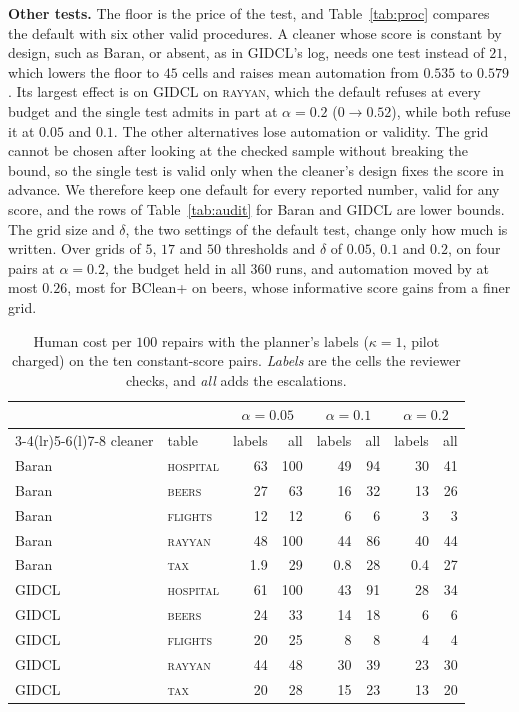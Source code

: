 \documentclass[sigconf, nonacm, balance=false]{acmart}
\theoremstyle{remark}
\begin{document}
\textbf{Other tests.} The floor is the price of the test, and Table~\ref{tab:proc}
compares the default with six other valid procedures. A cleaner whose score is
constant by design, such as Baran, or absent, as in GIDCL's log, needs one test instead of $21$, which lowers the
floor to $45$ cells and raises mean automation from $0.535$ to $0.579$. Its largest
effect is on GIDCL on \textsc{rayyan}, which the default refuses at every budget and
the single test admits in part at $\alpha=0.2$ ($0\to0.52$), while both refuse it at
$0.05$ and $0.1$. The other alternatives lose automation or validity. The grid cannot be chosen after
looking at the checked sample without breaking the bound, so the single test is valid
only when the cleaner's design fixes the score in advance. We therefore keep one
default for every reported number, valid for any score, and the rows of
Table~\ref{tab:audit} for Baran and GIDCL are lower bounds. The grid size and $\delta$, the two settings of the default test,
change only how much is written. Over grids of $5$, $17$ and $50$ thresholds and $\delta$ of $0.05$, $0.1$ and
$0.2$, on four pairs at $\alpha=0.2$, the budget held in all $360$ runs, and automation
moved by at most $0.26$, most for BClean+ on beers, whose informative score gains
from a finer grid.

\begin{table}[t]
  \centering
  \caption{Human cost per $100$ repairs with the planner's labels ($\kappa=1$, pilot
  charged) on the ten constant-score pairs. \emph{Labels} are the cells the reviewer checks,
  and \emph{all} adds the escalations.}
  \label{tab:labels}
  \small
  \setlength{\tabcolsep}{4pt}
  \renewcommand{\arraystretch}{0.93}
  \begin{tabular}{@{}ll rr rr rr@{}}
  \toprule
  & & \multicolumn{2}{c}{$\alpha=0.05$} & \multicolumn{2}{c}{$\alpha=0.1$} & \multicolumn{2}{c}{$\alpha=0.2$} \\
  \cmidrule(lr){3-4}\cmidrule(lr){5-6}\cmidrule(l){7-8}
  cleaner & table & labels & all & labels & all & labels & all \\
  \midrule
  Baran & \textsc{hospital} & 63 & 100 & 49 & 94 & 30 & 41 \\
  Baran & \textsc{beers} & 27 & 63 & 16 & 32 & 13 & 26 \\
  Baran & \textsc{flights} & 12 & 12 & 6 & 6 & 3 & 3 \\
  Baran & \textsc{rayyan} & 48 & 100 & 44 & 86 & 40 & 44 \\
  Baran & \textsc{tax} & 1.9 & 29 & 0.8 & 28 & 0.4 & 27 \\
  GIDCL & \textsc{hospital} & 61 & 100 & 43 & 91 & 28 & 34 \\
  GIDCL & \textsc{beers} & 24 & 33 & 14 & 18 & 6 & 6 \\
  GIDCL & \textsc{flights} & 20 & 25 & 8 & 8 & 4 & 4 \\
  GIDCL & \textsc{rayyan} & 44 & 48 & 30 & 39 & 23 & 30 \\
  GIDCL & \textsc{tax} & 20 & 28 & 15 & 23 & 13 & 20 \\
  \bottomrule
  \end{tabular}
\end{table}
\end{document}
